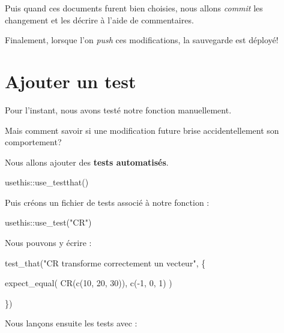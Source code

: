 \documentclass[
  letterpaper,
  DIV=11,
  numbers=noendperiod]{scrreprt}
\newenvironment{Shaded}{\begin{snugshade}}{\end{snugshade}}
\newcommand{\DecValTok}[1]{\textcolor[rgb]{0.68,0.00,0.00}{#1}}
\newcommand{\FunctionTok}[1]{\textcolor[rgb]{0.28,0.35,0.67}{#1}}
\newcommand{\NormalTok}[1]{\textcolor[rgb]{0.00,0.23,0.31}{#1}}
\newcommand{\SpecialCharTok}[1]{\textcolor[rgb]{0.37,0.37,0.37}{#1}}
\newcommand{\StringTok}[1]{\textcolor[rgb]{0.13,0.47,0.30}{#1}}
\begin{document}
Puis quand ces documents furent bien choisies, nous allons \emph{commit}
les changement et les décrire à l'aide de commentaires.

Finalement, lorsque l'on \emph{push} ces modifications, la sauvegarde
est déployé!

\section{Ajouter un test}\label{ajouter-un-test}

Pour l'instant, nous avons testé notre fonction manuellement.

Mais comment savoir si une modification future brise accidentellement
son comportement?

Nous allons ajouter des \textbf{tests automatisés}.

\begin{Shaded}
\begin{Highlighting}[]
\NormalTok{usethis}\SpecialCharTok{::}\FunctionTok{use\_testthat}\NormalTok{()}
\end{Highlighting}
\end{Shaded}

Puis créons un fichier de tests associé à notre fonction :

\begin{Shaded}
\begin{Highlighting}[]
\NormalTok{usethis}\SpecialCharTok{::}\FunctionTok{use\_test}\NormalTok{(}\StringTok{"CR"}\NormalTok{)}
\end{Highlighting}
\end{Shaded}

Nous pouvons y écrire :

\begin{Shaded}
\begin{Highlighting}[]
\FunctionTok{test\_that}\NormalTok{(}\StringTok{"CR transforme correctement un vecteur"}\NormalTok{, \{}

  \FunctionTok{expect\_equal}\NormalTok{(}
    \FunctionTok{CR}\NormalTok{(}\FunctionTok{c}\NormalTok{(}\DecValTok{10}\NormalTok{, }\DecValTok{20}\NormalTok{, }\DecValTok{30}\NormalTok{)),}
    \FunctionTok{c}\NormalTok{(}\SpecialCharTok{{-}}\DecValTok{1}\NormalTok{, }\DecValTok{0}\NormalTok{, }\DecValTok{1}\NormalTok{)}
\NormalTok{  )}

\NormalTok{\})}
\end{Highlighting}
\end{Shaded}

Nous lançons ensuite les tests avec :
\end{document}
